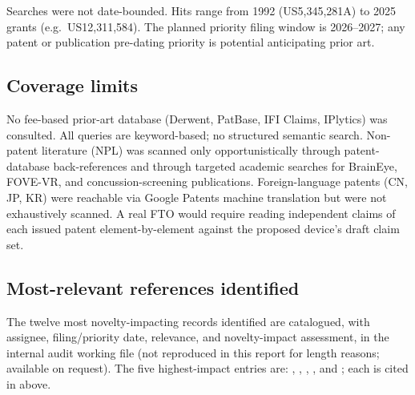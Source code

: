 Searches were not date-bounded. Hits range from 1992 (US5,345,281A) to 2025 grants (e.g.\ US12,311,584). The planned priority filing window is 2026--2027; any patent or publication pre-dating priority is potential anticipating prior art.

\subsection*{Coverage limits}

No fee-based prior-art database (Derwent, PatBase, IFI Claims, IPlytics) was consulted. All queries are keyword-based; no structured semantic search. Non-patent literature (NPL) was scanned only opportunistically through patent-database back-references and through targeted academic searches for BrainEye, FOVE-VR, and concussion-screening publications. Foreign-language patents (CN, JP, KR) were reachable via Google Patents machine translation but were not exhaustively scanned. A real FTO would require reading independent claims of each issued patent element-by-element against the proposed device's draft claim set.

\subsection*{Most-relevant references identified}

The twelve most novelty-impacting records identified are catalogued, with assignee, filing/priority date, relevance, and novelty-impact assessment, in the internal audit working file (not reproduced in this report for length reasons; available on request). The five highest-impact entries are: \citet{taboada1994}, \citet{neuropticspatent2017}, \citet{neurokineticshmd2017}, \citet{krueger2014ocular}, and \citet{syncthinkpatent2015}; each is cited in  above.
